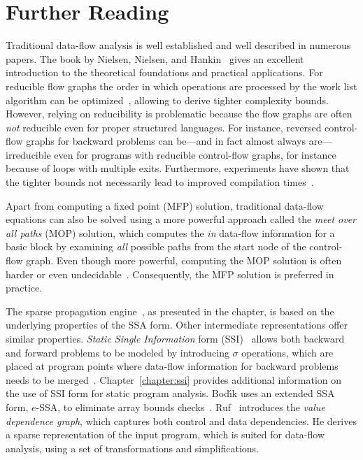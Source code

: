 \section{Further Reading}
\label{novillo:sec:further_reading}

Traditional data-flow analysis is well established and well described in
numerous papers. The book by Nielsen, Nielsen, and
Hankin~\cite{novillo:bib:NNH99} gives an excellent introduction to the
theoretical foundations and practical applications.
For reducible flow graphs the order in which operations are processed by the
work list algorithm can be
optimized~\cite{novillo:bib:HU73,novillo:bib:KU76,novillo:bib:NNH99}, allowing
to derive tighter complexity bounds. However, relying on reducibility is
problematic because the flow graphs are often \emph{not} reducible even for
proper structured languages. For instance, reversed control-flow graphs for backward
problems can be---and in fact almost always are---irreducible even for programs
with reducible control-flow graphs, for instance because of loops with multiple 
exits.  Furthermore, experiments have shown that the
tighter bounds not necessarily lead to improved compilation
times~\cite{novillo:bib:CTK06}.

Apart from computing a fixed point (MFP) solution, traditional data-flow
equations can also
be solved using a more powerful approach called the \emph{meet over all paths}
(MOP) solution, which computes the \emph{in} data-flow information for a basic
block by examining \emph{all} possible paths from the start node of the control-flow graph. Even though more powerful, computing the MOP solution is often
harder or even undecidable~\cite{novillo:bib:NNH99}. Consequently,
the MFP solution is preferred in practice.

The sparse propagation engine~\cite{novillo:bib:N05,bib:wegman.ea-91}, as
presented in the chapter, is based on the
underlying properties of the SSA form. Other intermediate representations offer
similar properties. \emph{Static Single Information} form
(SSI)~\cite{novillo:bib:S05} allows both backward and forward problems to be
modeled by introducing $\sigma$ operations, which are placed at program points
where data-flow information for backward problems needs to be
merged~\cite{novillo:bib:S04}. Chapter~\ref{chapter:ssi} provides additional
information on the use of SSI form for static program analysis.
Bod\'{\i}k uses an extended SSA form, $e$-SSA,
to eliminate array bounds checks~\cite{novillo:bib:BGV00}.
Ruf~\cite{novillo:bib:R95} introduces the \emph{value dependence graph}, which
captures both control and data dependencies. He derives a sparse representation
of the input program, which is suited for data-flow analysis, using a set of
transformations and simplifications.

